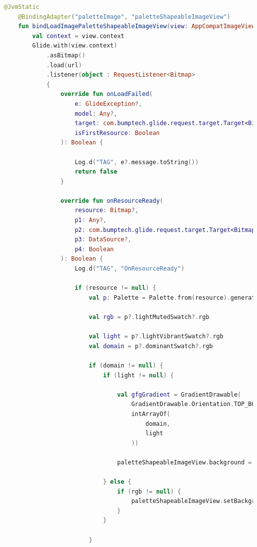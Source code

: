 \documentclass[a4paper, 12pt]{article}
\begin{document}
\begin{lstlisting}[caption={Add New View Adapters on ViewBindings.}, label={code:view_adapters}, language=Kotlin]
    @JvmStatic
    @BindingAdapter("paletteImage", "paletteShapeableImageView")
    fun bindLoadImagePaletteShapeableImageView(view: AppCompatImageView, url: String, paletteShapeableImageView: ShapeableImageView) {
        val context = view.context
        Glide.with(view.context)
            .asBitmap()
            .load(url)
            .listener(object : RequestListener<Bitmap>
            {
                override fun onLoadFailed(
                    e: GlideException?,
                    model: Any?,
                    target: com.bumptech.glide.request.target.Target<Bitmap>?,
                    isFirstResource: Boolean
                ): Boolean {

                    Log.d("TAG", e?.message.toString())
                    return false
                }

                override fun onResourceReady(
                    resource: Bitmap?,
                    p1: Any?,
                    p2: com.bumptech.glide.request.target.Target<Bitmap>?,
                    p3: DataSource?,
                    p4: Boolean
                ): Boolean {
                    Log.d("TAG", "OnResourceReady")

                    if (resource != null) {
                        val p: Palette = Palette.from(resource).generate()

                        val rgb = p?.lightMutedSwatch?.rgb

                        val light = p?.lightVibrantSwatch?.rgb
                        val domain = p?.dominantSwatch?.rgb

                        if (domain != null) {
                            if (light != null) {

                                val gfgGradient = GradientDrawable(
                                    GradientDrawable.Orientation.TOP_BOTTOM,
                                    intArrayOf(
                                        domain,
                                        light
                                    ))

                                paletteShapeableImageView.background = gfgGradient

                            } else {
                                if (rgb != null) {
                                    paletteShapeableImageView.setBackgroundColor(rgb)
                                }
                            }

                        }



\end{lstlisting}
\end{document}
